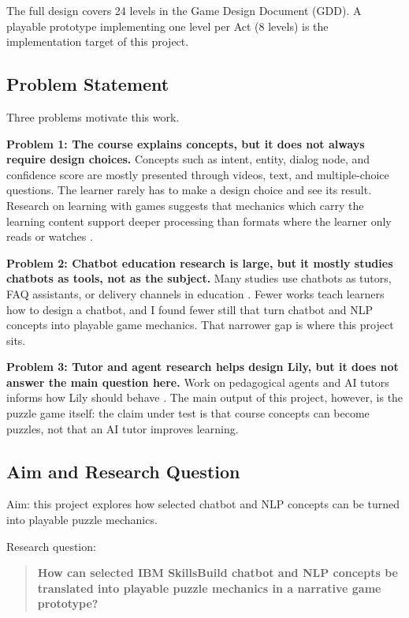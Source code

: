 \documentclass[11pt,a4paper]{article}
\begin{document}
The full design covers 24 levels in the Game Design Document (GDD). A playable prototype implementing one level per Act (8 levels) is the implementation target of this project.

\subsection{Problem Statement}

Three problems motivate this work.

\textbf{Problem 1: The course explains concepts, but it does not always require design choices.}
Concepts such as intent, entity, dialog node, and confidence score are mostly presented through videos, text, and multiple-choice questions. The learner rarely has to make a design choice and see its result. Research on learning with games suggests that mechanics which carry the learning content support deeper processing than formats where the learner only reads or watches \cite{mayer2019,sweller1988}.

\textbf{Problem 2: Chatbot education research is large, but it mostly studies chatbots as tools, not as the subject.}
Many studies use chatbots as tutors, FAQ assistants, or delivery channels in education \cite{okonkwo2021,wollny2021,smutny2020,labadze2023,winkler2018,perez2020}. Fewer works teach learners how to design a chatbot, and I found fewer still that turn chatbot and NLP concepts into playable game mechanics. That narrower gap is where this project sits.

\textbf{Problem 3: Tutor and agent research helps design Lily, but it does not answer the main question here.}
Work on pedagogical agents and AI tutors informs how Lily should behave \cite{moreno2001,kimbaylor2006,yusuf2025}. The main output of this project, however, is the puzzle game itself: the claim under test is that course concepts can become puzzles, not that an AI tutor improves learning.

\subsection{Aim and Research Question}

Aim: this project explores how selected chatbot and NLP concepts can be turned into playable puzzle mechanics.

Research question:

\begin{quote}
\textbf{How can selected IBM SkillsBuild chatbot and NLP concepts be translated into playable puzzle mechanics in a narrative game prototype?}
\end{quote}
\end{document}
